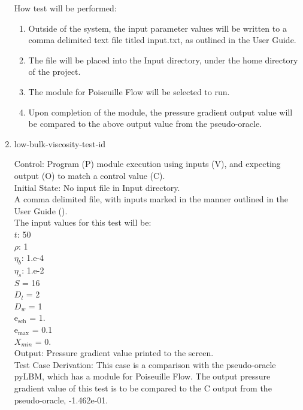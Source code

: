 \documentclass[12pt, titlepage]{article}
\newcounter{testcounter} %
\begin{document}
\begin{enumerate}
How test will be performed: 

\begin{enumerate}
\item Outside of the system, the input parameter values will be written to a
comma delimited text file titled input.txt, as outlined in the User Guide.
\item The file will be placed into the Input directory, under the home directory
of the project.
\item The module for Poiseuille Flow will be selected to run.
\item Upon completion of the module, the pressure gradient output value will be
compared to the above output value from the pseudo-oracle.
\end{enumerate}	

\item{low-bulk-viscosity-test-id\thetestcounter \\}

Control: Program (P) module execution using inputs (V), and expecting output (O) to match a control value (C).\\
					
Initial State: No input file in Input directory.\\
					
A comma delimited file, with inputs marked in the manner outlined in the User
Guide (\citet{LBM_UserGuide_PM}).\\The input values for this test will be:\\
$t$: 50\\
$\rho$: 1\\
$\eta_b$: 1.e-4\\
$\eta_s$: 1.e-2\\
$S$ = 16\\
$D_{l}$ = 2\\
$D_{w}$ = 1\\
$\mathrm{e_{sch}}$ = 1.\\
$\mathrm{e_{max}}$ = 0.1\\
$X_{min}$ = 0.\\

Output: Pressure gradient value printed to the screen. \\ 

Test Case Derivation: This case is a comparison with the pseudo-oracle pyLBM,
which has a module for Poiseuille Flow. The output pressure gradient value of
this test is to be compared to the C output from the pseudo-oracle,
-1.462e-01.\\


\end{enumerate}
\end{document}
